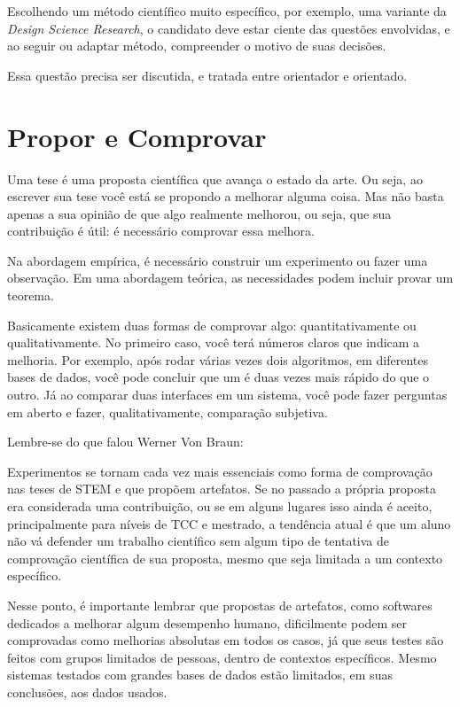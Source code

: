 Escolhendo um método científico muito específico, por exemplo, uma variante da\textit{ Design Science Research}\citep{hevner2004design,Pimentel2019}, o candidato deve estar ciente das questões envolvidas, e ao seguir ou adaptar método, compreender o motivo de suas decisões. 

Essa questão precisa ser discutida, e tratada entre orientador e orientado.

\section{Propor e Comprovar}

Uma tese é uma proposta científica que avança o estado da arte. 
Ou seja, ao escrever sua tese você está se propondo a melhorar alguma coisa. 
Mas não basta apenas a sua opinião de que algo realmente melhorou, ou seja, que sua contribuição é útil: é necessário comprovar essa melhora.

Na abordagem empírica, é necessário construir um experimento ou fazer uma observação. Em uma abordagem teórica, as necessidades podem incluir provar um teorema.

Basicamente existem duas formas de comprovar algo: quantitativamente ou qualitativamente. No primeiro caso, você terá números claros que indicam a melhoria. Por exemplo, após rodar várias vezes dois algoritmos, em diferentes bases de dados, você pode concluir que um é duas vezes mais rápido do que o outro. Já ao comparar duas interfaces em um sistema, você pode fazer perguntas em aberto e fazer, qualitativamente, comparação subjetiva.


Lembre-se do que falou Werner Von Braun:

Experimentos se tornam cada vez mais essenciais como forma de comprovação nas teses de STEM e que propõem artefatos. Se no passado a própria proposta era considerada uma contribuição, ou se em alguns lugares isso ainda é aceito, principalmente para níveis de TCC e mestrado, a tendência atual é que um aluno não vá defender um trabalho científico sem algum tipo de tentativa de comprovação científica de sua proposta, mesmo que seja limitada a um contexto específico.

Nesse ponto, é importante lembrar que propostas de artefatos, como softwares dedicados a melhorar algum desempenho humano, dificilmente podem ser comprovadas como melhorias absolutas em todos os casos, já que seus testes são feitos com grupos limitados de pessoas, dentro de contextos específicos. Mesmo sistemas testados com grandes bases de dados estão limitados, em suas conclusões, aos dados usados.

